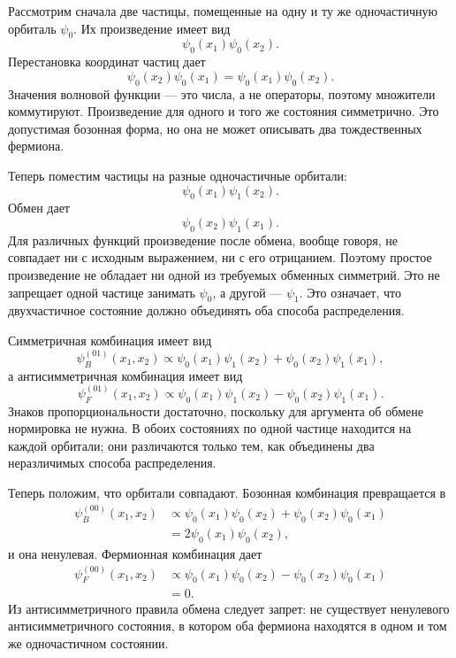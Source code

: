 Рассмотрим сначала две частицы, помещенные на одну и ту же одночастичную орбиталь \(\psi_0\). Их произведение имеет вид
\begin{equation}
\psi_0(x_1)\psi_0(x_2).
\end{equation}
Перестановка координат частиц дает
\begin{equation}
\psi_0(x_2)\psi_0(x_1)
=
\psi_0(x_1)\psi_0(x_2).
\end{equation}
Значения волновой функции — это числа, а не операторы, поэтому множители коммутируют. Произведение для одного и того же состояния симметрично. Это допустимая бозонная форма, но она не может описывать два тождественных фермиона.

Теперь поместим частицы на разные одночастичные орбитали:
\begin{equation}
\psi_0(x_1)\psi_1(x_2).
\end{equation}
Обмен дает
\begin{equation}
\psi_0(x_2)\psi_1(x_1).
\end{equation}
Для различных функций произведение после обмена, вообще говоря, не совпадает ни с исходным выражением, ни с его отрицанием. Поэтому простое произведение не обладает ни одной из требуемых обменных симметрий. Это не запрещает одной частице занимать \(\psi_0\), а другой — \(\psi_1\). Это означает, что двухчастичное состояние должно объединять оба способа распределения.

Симметричная комбинация имеет вид
\begin{equation}
\psi_B^{(01)}(x_1,x_2)
\propto
\psi_0(x_1)\psi_1(x_2)
+
\psi_0(x_2)\psi_1(x_1),
\end{equation}
а антисимметричная комбинация имеет вид
\begin{equation}
\psi_F^{(01)}(x_1,x_2)
\propto
\psi_0(x_1)\psi_1(x_2)
-
\psi_0(x_2)\psi_1(x_1).
\end{equation}
Знаков пропорциональности достаточно, поскольку для аргумента об обмене нормировка не нужна. В обоих состояниях по одной частице находится на каждой орбитали; они различаются только тем, как объединены два неразличимых способа распределения.

Теперь положим, что орбитали совпадают. Бозонная комбинация превращается в
\begin{align}
\psi_B^{(00)}(x_1,x_2)
&\propto
\psi_0(x_1)\psi_0(x_2)
+
\psi_0(x_2)\psi_0(x_1)\\
&=
2\psi_0(x_1)\psi_0(x_2),
\end{align}
и она ненулевая. Фермионная комбинация дает
\begin{align}
\psi_F^{(00)}(x_1,x_2)
&\propto
\psi_0(x_1)\psi_0(x_2)
-
\psi_0(x_2)\psi_0(x_1)\\
&=0.
\end{align}
Из антисимметричного правила обмена следует запрет: не существует ненулевого антисимметричного состояния, в котором оба фермиона находятся в одном и том же одночастичном состоянии.

